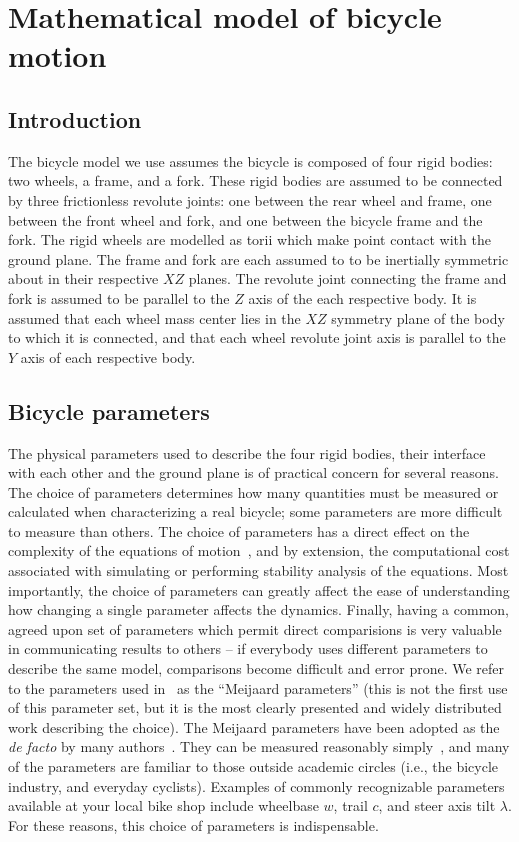 \chapter{Mathematical model of bicycle motion} \label{chapter2}

\section{Introduction}
The bicycle model we use assumes the bicycle is composed of four rigid bodies:
two wheels, a frame, and a fork. These rigid bodies are assumed to be connected
by three frictionless revolute joints: one between the rear wheel and frame,
one between the front wheel and fork, and one between the bicycle frame and the
fork. The rigid wheels are modelled as torii which make point contact with the
ground plane. The frame and fork are each assumed to to be inertially
symmetric about in their respective $XZ$ planes. The revolute joint connecting
the frame and fork is assumed to be parallel to the $Z$ axis of the
each respective body. It is assumed that each wheel mass center lies in the
$XZ$ symmetry plane of the body to which it is connected, and that each wheel
revolute joint axis is parallel to the $Y$ axis of each respective body.

\section{Bicycle parameters}
The physical parameters used to describe the four rigid bodies, their interface
with each other and the ground plane is of practical concern for several
reasons. The choice of parameters determines how many quantities must be
measured or calculated when characterizing a real bicycle; some parameters are
more difficult to measure than others. The choice of parameters has a direct
effect on the complexity of the equations of
motion~\cite{Wittenburg2008,Mitiguy2001}, and by extension, the computational
cost associated with simulating or performing stability analysis of the
equations. Most importantly, the choice of parameters can greatly affect the
ease of understanding how changing a single parameter affects the dynamics.
Finally, having a common, agreed upon set of parameters which permit direct
comparisions is very valuable in communicating results to others -- if
everybody uses different parameters to describe the same model, comparisons
become difficult and error prone. We refer to the parameters used
in~\cite{Meijaard2007} as the ``Meijaard parameters'' (this is not the first
use of this parameter set, but it is the most clearly presented and widely
distributed work describing the choice). The Meijaard parameters have been
adopted as the \textit{de facto} by many authors~\cite{Sharp2008}. They can be
measured reasonably simply~\cite{Moore2010b}, and many of the parameters are
familiar to those outside academic circles (i.e., the bicycle industry, and
everyday cyclists). Examples of commonly recognizable parameters available at
your local bike shop include wheelbase $w$, trail $c$, and steer axis tilt
$\lambda$. For these reasons, this choice of parameters is indispensable.

